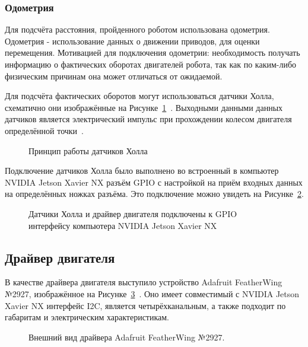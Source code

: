 \subsubsection{Одометрия} \label{sec:odom}
Для подсчёта расстояния, пройденного роботом использована одометрия. Одометрия - использование данных о движении приводов, для оценки перемещения. Мотивацией для подключения одометрии: необходимость получать информацию о фактических оборотах двигателей робота, так как по каким-либо физическим причинам она может отличаться от ожидаемой.

Для подсчёта фактических оборотов могут использоваться датчики Холла, схематично они изображённые на Рисунке~\cref{fig:hole}~\cite{hole}. Выходными данными данных датчиков является электрический импульс при прохождении колесом двигателя определённой точки~\cite[с. 265]{hole-book}.

\begin{figure}[ht]
    \caption{Принцип работы датчиков Холла}\label{fig:hole}
\end{figure}

Подключение датчиков Холла было выполнено во встроенный в компьютер NVIDIA Jetson Xavier NX разъём GPIO с настройкой на приём входных данных на определённых ножках разъёма. Это подключение можно увидеть на Рисунке~\cref{fig:gpio-wire}.

\begin{figure}[ht]
    \caption{Датчики Холла и драйвер двигателя подключены к GPIO интерфейсу компьютера NVIDIA Jetson Xavier NX}\label{fig:gpio-wire}
\end{figure}

\subsection{Драйвер двигателя}
В качестве драйвера двигателя выступило устройство Adafruit FeatherWing №2927, изображённое на Рисунке~\cref{fig:adafruit}~\cite{adafruit}. Оно имеет совместимый с NVIDIA Jetson Xavier NX интерфейс I2C, является четырёхканальным, а также подходит по габаритам и электрическим характеристикам.

\begin{figure}[ht]
    \caption{Внешний вид драйвера Adafruit FeatherWing №2927.}\label{fig:adafruit}
\end{figure}

